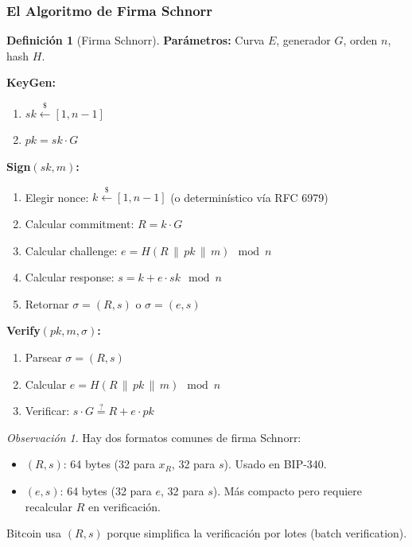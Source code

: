 \documentclass[11pt,a4paper,twoside,openright]{book}
\theoremstyle{definition}
\newtheorem{definition}{Definición}[chapter]
\theoremstyle{plain}
\theoremstyle{remark}
\newtheorem{remark}{Observación}[chapter]
\begin{document}
\subsubsection{El Algoritmo de Firma Schnorr}

\begin{definition}[Firma Schnorr]
\textbf{Parámetros:} Curva $E$, generador $G$, orden $n$, hash $H$.

\textbf{KeyGen:}
\begin{enumerate}
    \item $sk \xleftarrow{\$} [1, n-1]$
    \item $pk = sk \cdot G$
\end{enumerate}

\textbf{Sign$(sk, m)$:}
\begin{enumerate}
    \item Elegir nonce: $k \xleftarrow{\$} [1, n-1]$ (o determinístico vía RFC 6979)
    \item Calcular commitment: $R = k \cdot G$
    \item Calcular challenge: $e = H(R \,\|\, pk \,\|\, m) \mod n$
    \item Calcular response: $s = k + e \cdot sk \mod n$
    \item Retornar $\sigma = (R, s)$ o $\sigma = (e, s)$
\end{enumerate}

\textbf{Verify$(pk, m, \sigma)$:}
\begin{enumerate}
    \item Parsear $\sigma = (R, s)$
    \item Calcular $e = H(R \,\|\, pk \,\|\, m) \mod n$
    \item Verificar: $s \cdot G \stackrel{?}{=} R + e \cdot pk$
\end{enumerate}
\end{definition}

\begin{remark}
Hay dos formatos comunes de firma Schnorr:
\begin{itemize}
    \item $(R, s)$: 64 bytes (32 para $x_R$, 32 para $s$). Usado en BIP-340.
    \item $(e, s)$: 64 bytes (32 para $e$, 32 para $s$). Más compacto pero requiere recalcular $R$ en verificación.
\end{itemize}

Bitcoin usa $(R, s)$ porque simplifica la verificación por lotes (batch verification).
\end{remark}
\end{document}
